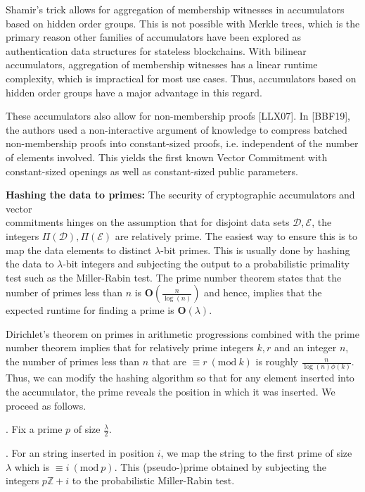 \documentclass[11pt, lettersize, notitlepage, leqno, footskip=0.6cm]{article}
\newcommand{\bz}{\mathbb Z}
\newcommand{\mc}{\mathcal}
\newcommand{\mbf}{\mathbf}
\newcommand{\lam}{\lambda}
\newcommand{\noin}{\noindent}
\newcommand{\Mod}[1]{\ (\mathrm{mod}\ #1)}
\numberwithin{equation}{section}
\begin{document}
Shamir's trick allows for aggregation of membership witnesses in accumulators based on hidden order groups. This is not possible with Merkle trees, which is the primary reason other families of accumulators have been explored as authentication data structures for stateless blockchains. With bilinear accumulators, aggregation of membership witnesses has a linear runtime complexity, which is impractical for most use cases. Thus, accumulators based on hidden order groups have a major advantage in this regard.

These accumulators also allow for non-membership proofs [LLX07]. In [BBF19], the authors used a non-interactive argument of knowledge to compress batched non-membership proofs into constant-sized proofs, i.e. independent of the number of elements involved. This yields the first known Vector Commitment with constant-sized openings as well as  constant-sized public parameters.\vspace{0.1cm}

\noin \textbf{Hashing the data to primes:} The security of cryptographic accumulators and vector\\ commitments hinges on the assumption that for disjoint data sets $\mc{D},\mc{E}$, the integers $\Pi(\mc{D}), \Pi(\mc{E})$ are relatively prime. The easiest way to ensure this is to map the data elements to distinct $\lam$-bit primes. This is usually done by hashing the data to $\lam$-bit integers and subjecting the output to a probabilistic primality test such as the Miller-Rabin test. The prime number theorem states that the number of primes less than $n$ is $\mbf{O}(\frac{n}{\log(n)})$ and hence, implies that the expected runtime for finding a prime is $\mbf{O}(\lam)$.

Dirichlet's theorem on primes in arithmetic progressions combined with the prime number theorem implies that for relatively prime integers $k,r$ and an integer $n$, the number of primes less than $n$ that are $\equiv r\Mod{k}$ is roughly $\frac{n}{\log(n)\phi(k)}$. Thus, we can modify the hashing algorithm so that for any element inserted into the accumulator, the prime reveals the position in which it was inserted. We proceed as follows.\vspace{0.1cm}

\noin 1. Fix a prime $p$ of size $\frac{\lam}{2}$. 

\noin 2. For an string inserted in position $i$, we map the string to the first prime of size $\lam$ which is $\equiv i\Mod{p}$. This (pseudo-)prime obtained by subjecting the integers $p\bz+i$ to the probabilistic Miller-Rabin test. \vspace{0.1cm}
\end{document}
